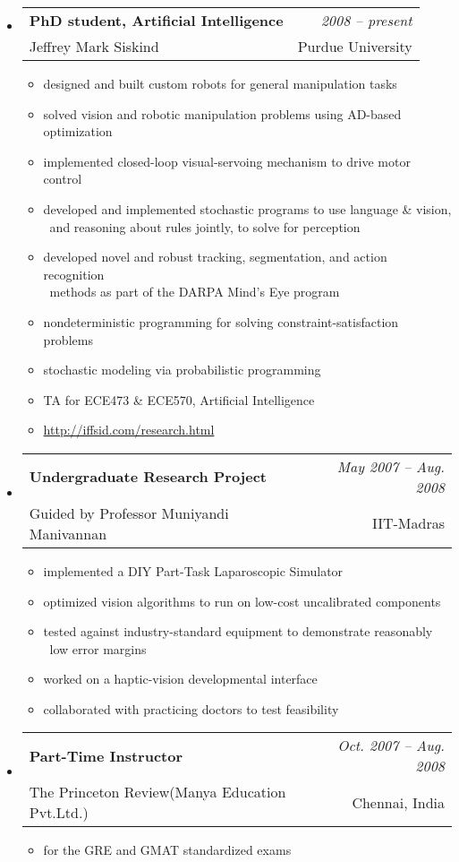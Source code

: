 \documentclass[10pt]{article}
\makeatletter
\newenvironment{position}[4]
{\filbreak
\item
  \begin{tabular*}{6.5in}{l@{\extracolsep{\fill}}r}
    \textbf{#1} & \textit{#2} \\ #3 & \footnotesize{#4} \\
  \end{tabular*}
  \begin{itemize} \setlength{\parskip}{-1pt}}
  { \end{itemize} }
\newenvironment{region}[1] {{\large \textbf{#1}} \begin{itemize}} {\end{itemize}}
\makeatother
\begin{document}
\begin{region} {Experience}
  \begin{position} {PhD student, Artificial Intelligence}
    {2008 -- present}
    {Jeffrey Mark Siskind}
    {Purdue University}
  \item designed and built custom robots for general manipulation tasks
  \item solved vision and robotic manipulation problems using AD-based optimization
  \item implemented closed-loop visual-servoing mechanism to drive motor control
  \item developed and implemented stochastic programs to use language \& vision,\\
    \  and reasoning about rules jointly, to solve for perception
  \item developed novel and robust tracking, segmentation, and action recognition\\
    \  methods as part of the DARPA Mind's Eye program
  \item nondeterministic programming for solving constraint-satisfaction problems
  \item stochastic modeling via probabilistic programming
  \item TA for ECE473 \& ECE570, Artificial Intelligence
  \item \url{http://iffsid.com/research.html}
  \end{position}
  \begin{position} {Undergraduate Research Project}
    {May 2007 -- Aug. 2008}
    {Guided by Professor Muniyandi Manivannan}
    {IIT-Madras}
  \item implemented a DIY Part-Task Laparoscopic Simulator
  \item optimized vision algorithms to run on low-cost uncalibrated components
  \item tested against industry-standard equipment to demonstrate reasonably\\
    \  low error margins
  \item worked on a haptic-vision developmental interface
  \item collaborated with practicing doctors to test feasibility
  \end{position}
  \begin{position} {Part-Time Instructor}
    {Oct. 2007 -- Aug. 2008}
    {The Princeton Review(Manya Education Pvt.Ltd.)}
    {Chennai, India}
  \item for the GRE and GMAT standardized exams

\end{position}
\end{region}
\end{document}
